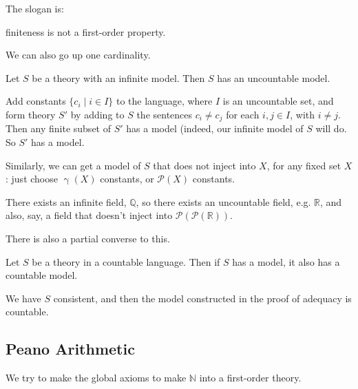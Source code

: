 \documentclass[12pt]{article}
\begin{document}
The slogan is:
\begin{center}
	finiteness is not a first-order property.
\end{center}

We can also go up one cardinality.

\begin{theorem}
	Let $S$ be a theory with an infinite model. Then $S$ has an uncountable model.
\end{theorem}

\begin{proofbox}
	Add constants $\{c_i \mid i \in I\}$ to the language, where $I$ is an uncountable set, and form theory $S'$ by adding to $S$ the sentences $c_i \neq c_j$ for each $i,j \in I$, with $i \neq j$. Then any finite subset of $S'$ has a model (indeed, our infinite model of $S$ will do. So $S'$ has a model.
\end{proofbox}

Similarly, we can get a model of $S$ that does not inject into $X$, for any fixed set $X$: just choose $\upgamma(X)$ constants, or $\mathcal{P}(X)$ constants.

\begin{exbox}
	There exists an infinite field, $\mathbb{Q}$, so there exists an uncountable field, e.g. $\mathbb{R}$, and also, say, a field that doesn't inject into $\mathcal{P}(\mathcal{P}(\mathbb{R}))$.
\end{exbox}

There is also a partial converse to this.

\begin{theorem}
	Let $S$ be a theory in a countable language. Then if $S$ has a model, it also has a countable model.
\end{theorem}

\begin{proofbox}
	We have $S$ consistent, and then the model constructed in the proof of adequacy is countable.
\end{proofbox}

\subsection{Peano Arithmetic}
\label{sub:peano_arithmetic}

We try to make the global axioms to make $\mathbb{N}$ into a first-order theory.
\end{document}
